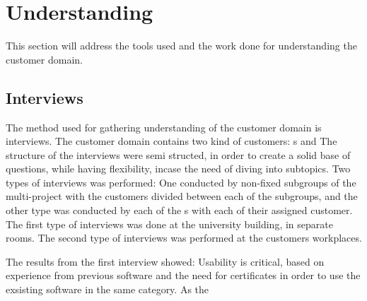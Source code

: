 \section{Understanding}
This section will address the tools used and the work done for understanding the customer domain.

\subsection{Interviews}
The method used for gathering understanding of the customer domain is interviews.
The customer domain contains two kind of customers: s and \autists{} 
The structure of the interviews were semi structed, in order to create a solid base of questions, while having flexibility, incase the need of diving into subtopics.
Two types of interviews was performed: One conducted by non-fixed subgroups of the multi-project with the customers divided between each of the subgroups, and the other type was conducted by each of the \localgroup{}s with each of their assigned customer.
The first type of interviews was done at the university building, in separate rooms.
The second type of interviews was performed at the customers workplaces.

The results from the first interview showed: Usability is critical, based on experience from previous software and the need for certificates in order to use the exsisting software in the same category. As the \guardian{} 

